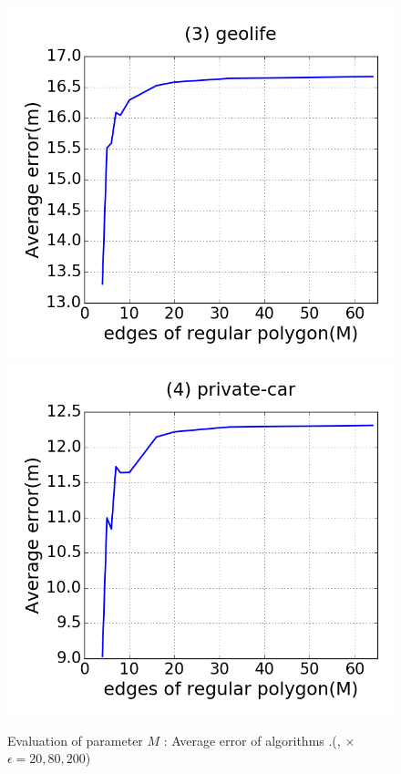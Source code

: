 \begin{figure}[tb!]
\includegraphics[scale = 0.25]{figures/Exp-M-error-geolife.png}
\includegraphics[scale = 0.25]{figures/Exp-M-error-private.png}
\vspace{-2ex}
\caption{\small Evaluation of parameter $M$ : Average error of algorithms \cist.(\rpia, \cpia $\times$ $\epsilon = 20, 80, 200$)}
\label{fig:m-error-cist}
\vspace{-1ex}
\end{figure}

